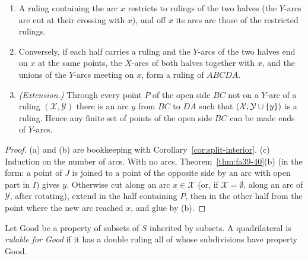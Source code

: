 
\begin{lemma}\label{lem:cut-glue}
\leavevmode
\begin{enumerate}[label=(\alph*)]
\item A ruling containing the arc $x$ restricts to rulings of the two halves (the $Y$-arcs are cut at their crossing with $x$), and
off $x$ its arcs are those of the restricted rulings.
\item Conversely, if each half carries a ruling and the $Y$-arcs of the two halves end on $x$ at the same points, the $X$-arcs of both
halves together with $x$, and the unions of the $Y$-arcs meeting on $x$, form a ruling of $ABCDA$.
\item \emph{(Extension.)} Through every point $P$ of the open side $BC$ not on a $Y$-arc of a ruling $(\mathcal X,\mathcal Y)$ there is an arc
$y$ from $BC$ to $DA$ such that $(\mathcal X,\mathcal Y\cup\left\{ y \right\})$ is a ruling. Hence any finite set of points of the open side $BC$ can be
made ends of $Y$-arcs.
\end{enumerate}
\end{lemma}

\begin{proof}
(a) and (b) are bookkeeping with Corollary~\ref{cor:split-interior}. (c) Induction on the number of arcs. With no arcs,
Theorem~\ref{thm:fa39-40}(b) (in the form: a point of $J$ is joined to a point of the opposite side by an arc with open part in $I$) gives
$y$. Otherwise cut along an arc $x\in\mathcal X$ (or, if $\mathcal X=\emptyset$, along an arc of $\mathcal Y$, after rotating), extend in the half
containing $P$, then in the other half from the point where the new arc reached $x$, and glue by (b).
\end{proof}


\begin{definition}
Let $\mathrm{Good}$ be a property of subsets of $S$ inherited by subsets. A quadrilateral is \emph{rulable for Good} if it has a
double ruling all of whose subdivisions have property Good.
\end{definition}


